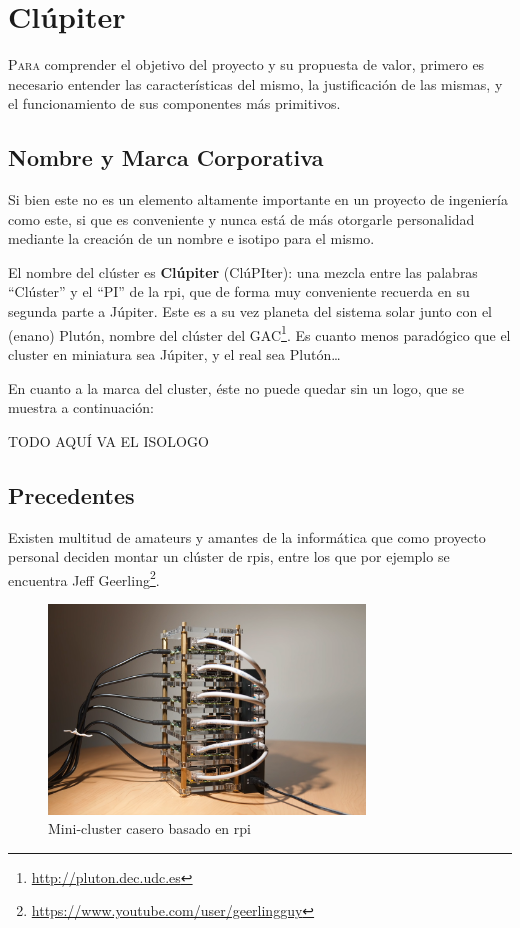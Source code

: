 \chapter{Clúpiter}
\label{chap:conceptos_basicos}

\lettrine{P}{ara} comprender el objetivo del proyecto y su propuesta de valor, primero es necesario entender las características del mismo, la justificación de las mismas, y el funcionamiento de sus componentes más primitivos.

\section{Nombre y Marca Corporativa}
Si bien este no es un elemento altamente importante en un proyecto de ingeniería como este, si que es conveniente y nunca está de más otorgarle personalidad mediante la creación de un nombre e isotipo para el mismo.

El nombre del clúster es \textbf{Clúpiter} (ClúPIter): una mezcla entre las palabras ``Clúster'' y el ``PI'' de la \acrlong{rpi}, que de forma muy conveniente recuerda en su segunda parte a Júpiter. Este es a su vez planeta del sistema solar junto con el (enano) Plutón, nombre del clúster del GAC\footnote{\url{http://pluton.dec.udc.es}}. Es cuanto menos paradógico que el cluster en miniatura sea Júpiter, y el real sea Plutón\dots

En cuanto a la marca del cluster, éste no puede quedar sin un logo, que se muestra a continuación:

TODO AQUÍ VA EL ISOLOGO %

\section{Precedentes}
Existen multitud de amateurs y amantes de la informática que como proyecto personal deciden montar un clúster de \acrlong{rpi}s, entre los que por ejemplo se encuentra Jeff Geerling\footnote{\url{https://www.youtube.com/user/geerlingguy}}.

\begin{figure}[h!]
  \centering
  \includegraphics[width=0.75\textwidth]{img/cluster-pi-home.png}
  \caption{Mini-cluster casero basado en \acrlong{rpi} \cite{geerling_intro_cluster}}
  \label{fig:cluster-pi-ejemplo}
\end{figure}

